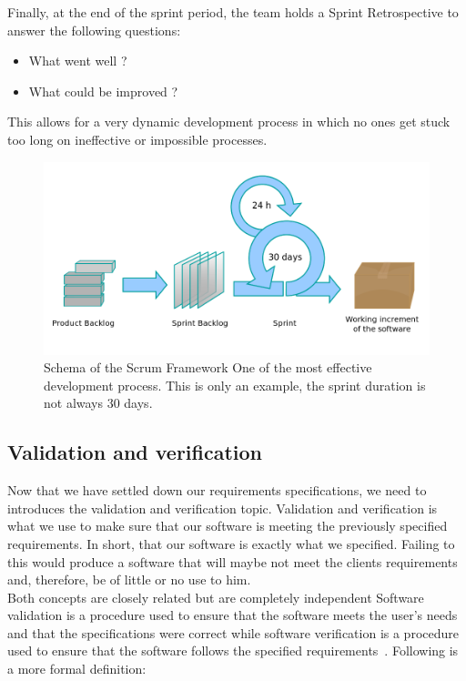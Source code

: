 \documentclass[12pt]{article}
\theoremstyle{definition}
\theoremstyle{definition}
\begin{document}
Finally, at the end of the sprint period, the team holds a Sprint Retrospective to answer the following questions:

\begin{itemize}

\item What went well ?
\item What could be improved ?

\end{itemize}

This allows for a very dynamic development process in which no ones get stuck too long on ineffective or impossible processes.

\begin{figure}
    \centering
    \includegraphics[scale=0.4]{scrum.png}
    \caption{Schema of the Scrum Framework One of the most effective development process. This is only an example, the sprint duration is not always 30 days.}
    \label{Scrum}
\end{figure}

\subsection{Validation and verification}

Now that we have settled down our requirements specifications, we need to introduces the validation and verification topic. Validation and verification is what we use to make sure that our software is meeting the previously specified requirements. In short, that our software is exactly what we specified. Failing to this would produce a software that will maybe not meet the clients requirements and, therefore, be of little or no use to him.\\

Both concepts are closely related but are completely independent Software validation is a procedure used to ensure that the software meets the user's needs and that the specifications were correct while software verification is a procedure used to ensure that the software follows the specified requirements~\cite{VnV:2016}. Following is a more formal definition:
\end{document}
